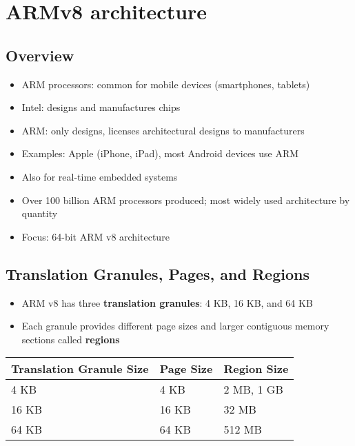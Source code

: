 \section{ARMv8 architecture}

\subsection*{Overview}
\begin{itemize}
    \item ARM processors: common for mobile devices (smartphones, tablets)
    \item Intel: designs and manufactures chips
    \item ARM: only designs, licenses architectural designs to manufacturers
    \item Examples: Apple (iPhone, iPad), most Android devices use ARM
    \item Also for real-time embedded systems
    \item Over 100 billion ARM processors produced; most widely used architecture by quantity
    \item Focus: 64-bit ARM v8 architecture
\end{itemize}

\subsection*{Translation Granules, Pages, and Regions}
\begin{itemize}
    \item ARM v8 has three \textbf{translation granules}: 4 KB, 16 KB, and 64 KB
    \item Each granule provides different page sizes and larger contiguous memory sections called \textbf{regions}
\end{itemize}

\begin{tabular}{p{}p{}p{}}
\toprule
\textbf{Translation Granule Size} & \textbf{Page Size} & \textbf{Region Size} \\
\midrule
4 KB & 4 KB & 2 MB, 1 GB \\
16 KB & 16 KB & 32 MB \\
64 KB & 64 KB & 512 MB \\
\bottomrule
\end{tabular}


